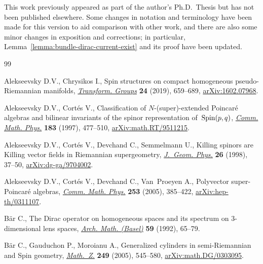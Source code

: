 \documentclass[pdftex]{sigma}
\numberwithin{equation}{section}
\newcommand{\1}{\mathbbm{1}}
\begin{document}
This work previously appeared as part of the author's Ph.D.~Thesis \cite{Beckett2024} but has not been published elsewhere. Some changes in notation and terminology have been made for this version to aid comparison with other work, and there are also some minor changes in exposition and corrections; in particular, Lemma~\ref{lemma:bundle-dirac-current-exist} and its proof have been updated.

\begin{thebibliography}{99}
\footnotesize\itemsep=0pt

Alekseevsky D.V., Chrysikos I., Spin structures on compact homogeneous
 pseudo-{R}iemannian manifolds,
 \href{https://doi.org/10.1007/s00031-018-9498-1}{\textit{Transform. Groups}}
 \textbf{24} (2019), 659--689,
 \href{http://arxiv.org/abs/1602.07968}{arXiv:1602.07968}.

Alekseevsky D.V., Cort\'es V., Classification of {$N$}-(super)-extended
 {P}oincar\'e algebras and bilinear invariants of the spinor representation
 of~{${\rm Spin}(p,q)$},
 \href{https://doi.org/10.1007/s002200050039}{\textit{Comm. Math. Phys.}}
 \textbf{183} (1997), 477--510,
 \href{http://arxiv.org/abs/math.RT/9511215}{arXiv:math.RT/9511215}.

Alekseevsky D.V., Cort\'es V., Devchand C., Semmelmann U., Killing spinors are
 {K}illing vector fields in {R}iemannian supergeometry,
 \href{https://doi.org/10.1016/S0393-0440(97)00036-3}{\textit{J.~Geom. Phys.}}
 \textbf{26} (1998), 37--50,
 \href{http://arxiv.org/abs/dg-ga/9704002}{arXiv:dg-ga/9704002}.

Alekseevsky D.V., Cort\'es V., Devchand C., Van~Proeyen A., Polyvector
 super-{P}oincar\'e algebras,
 \href{https://doi.org/10.1007/s00220-004-1155-y}{\textit{Comm. Math. Phys.}}
 \textbf{253} (2005), 385--422,
 \href{http://arxiv.org/abs/hep-th/0311107}{arXiv:hep-th/0311107}.

B\"ar C., The {D}irac operator on homogeneous spaces and its spectrum on
 {$3$}-dimensional lens spaces,
 \href{https://doi.org/10.1007/BF01199016}{\textit{Arch. Math. (Basel)}}
 \textbf{59} (1992), 65--79.

B\"ar C., Gauduchon P., Moroianu A., Generalized cylinders in semi-{R}iemannian
 and {S}pin geometry,
 \href{https://doi.org/10.1007/s00209-004-0718-0}{\textit{Math.~Z.}}
 \textbf{249} (2005), 545--580,
 \href{http://arxiv.org/abs/math.DG/0303095}{arXiv:math.DG/0303095}.


\end{thebibliography}
\end{document}

